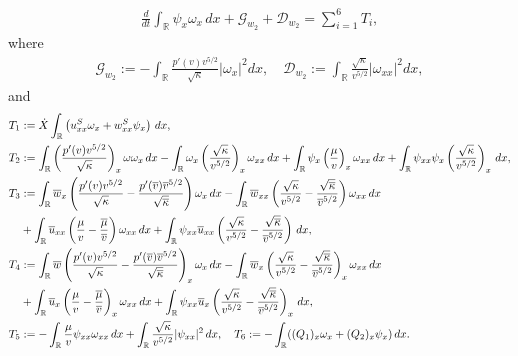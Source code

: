 \documentclass[11pt,reqno]{amsart}
\begin{document}
\begin{appendix}
\begin{align*}
\frac{d}{dt}\int_{\mathbb{R}}\psi_x\omega_x \, dx+\mathcal{G}_{w_2}+\mathcal{D}_{w_2}=\sum\limits_{i=1}^{6}T_i,
\end{align*}
where
\begin{align*}
\mathcal{G}_{w_2}:=-\int_{\mathbb{R}}  \frac{p'(v) v^{5/2}}{\sqrt{\kappa}} |\omega_x|^2dx,\quad
\mathcal{D}_{w_2}:=\int_{\mathbb{R}} \frac{\sqrt{\kappa}}{v^{5/2}} |\omega_{xx}|^2 dx,
\end{align*}
and
\begin{align*}
T_1&:=\dot{X} \int_\mathbb{R} \left( u^S_{xx} \omega_x+ w^S_{xx} \psi_x \right) \, dx, \\
T_2&:=\int_\mathbb{R} \left( \frac{p'(v) v^{5/2}}{\sqrt{\kappa}}\right)_x \omega \omega_x \, dx -\int_\mathbb{R} \omega_x \left( \frac{\sqrt{\kappa}}{v^{5/2}} \right)_x \omega_{xx} \, dx + \int_\mathbb{R} \psi_x \left( \frac{\mu}{v} \right)_x \omega_{xx} \, dx +\int_\mathbb{R} \psi_{xx} \psi_x \left(\frac{\sqrt{\kappa}}{v^{5/2}}\right)_x \, dx, \\
T_3&:=\int_\mathbb{R} \overline{w}_x \left( \frac{p'(v) v^{5/2}}{\sqrt{\kappa}} -\frac{p'(\overline{v})\overline{v}^{5/2}}{\sqrt{\overline{\kappa}}} \right) \omega_x \, dx -\int_\mathbb{R} \overline{w}_{xx} \left( \frac{\sqrt{\kappa}}{v^{5/2}}-\frac{\sqrt{\overline{\kappa}}}{\overline{v}^{5/2}}\right) \omega_{xx} \, dx \\ 
&+\int_{\mathbb{R}} \overline{u}_{xx} \left( \frac{\mu}{v}-\frac{\overline{\mu}}{\overline{v}} \right)\omega_{xx} \, d x+\int_\mathbb{R} \psi_{xx}\overline{u}_{xx} \left( \frac{\sqrt{\kappa}}{v^{5/2}}-\frac{\sqrt{\overline{\kappa}}}{\overline{v}^{5/2}} \right) \, dx, \\
T_4&:=\int_\mathbb{R} \overline{w} \left( \frac{p'(v) v^{5/2}}{\sqrt{\kappa}} -\frac{p'(\overline{v})\overline{v}^{5/2}}{\sqrt{\overline{\kappa}}} \right)_x \omega_x \, dx-\int_\mathbb{R} \overline{w}_x \left( \frac{\sqrt{\kappa}}{v^{5/2}} -\frac{\sqrt{\overline{\kappa}}}{\overline{v}^{5/2}}\right)_x \omega_{xx} \, dx \\
&+\int_\mathbb{R} \overline{u}_x \left( \frac{\mu}{v}-\frac{\overline{\mu}}{\overline{v}} \right)_x \omega_{xx} \, dx+\int_\mathbb{R} \psi_{xx}\overline{u}_x \left(\frac{\sqrt{\kappa}}{v^{5/2}}-\frac{\sqrt{\overline{\kappa}}}{\overline{v}^{5/2}}\right)_x  \, dx,\\
T_{5}&:=-\int_\mathbb{R} \frac{\mu}{v}\psi_{xx} \omega_{xx} \, dx+\int_\mathbb{R}  \frac{\sqrt{\kappa}}{v^{5/2}} |\psi_{xx}|^2 \, dx, \quad 
T_{6}:=-\int_\mathbb{R}( (Q_1)_x \omega_x + (Q_2)_x \psi_x) \, dx.
\end{align*}



\end{appendix}
\end{document}

